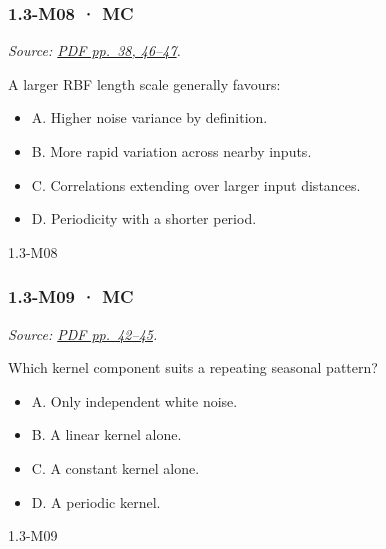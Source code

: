 \noindent\begin{minipage}{\linewidth}

\subsubsection{1.3-M08 · MC}\label{m08-mc-2}

\emph{Source:
\href{../Lecture\%20Slides/1.3.\%20Bayesian\%20Learning.pdf\#page=38}{PDF
pp.~38, 46--47}.}

A larger RBF length scale generally favours:

\begin{itemize}
\tightlist
\item
  A. Higher noise variance by definition.
\item
  B. More rapid variation across nearby inputs.
\item
  C. Correlations extending over larger input distances.
\item
  D. Periodicity with a shorter period.
\end{itemize}

\begin{solution}[8mm]{1.3-M08}

\end{solution}
\end{minipage}\par\medskip

\noindent\begin{minipage}{\linewidth}

\subsubsection{1.3-M09 · MC}\label{m09-mc-2}

\emph{Source:
\href{../Lecture\%20Slides/1.3.\%20Bayesian\%20Learning.pdf\#page=42}{PDF
pp.~42--45}.}

Which kernel component suits a repeating seasonal pattern?

\begin{itemize}
\tightlist
\item
  A. Only independent white noise.
\item
  B. A linear kernel alone.
\item
  C. A constant kernel alone.
\item
  D. A periodic kernel.
\end{itemize}

\begin{solution}[8mm]{1.3-M09}

\end{solution}
\end{minipage}\par\medskip


